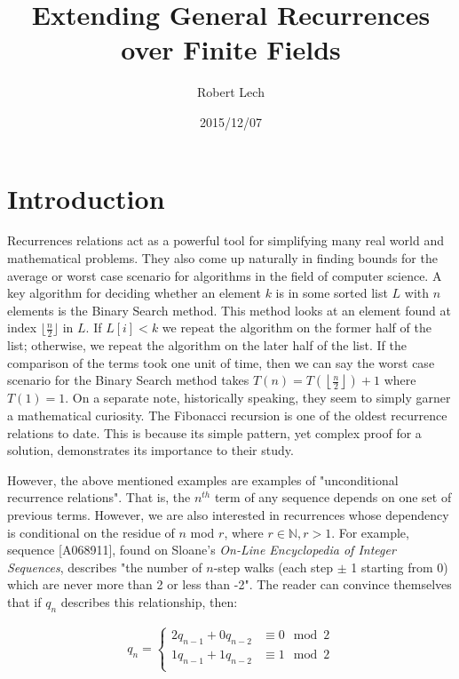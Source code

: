 \documentclass[a4paper]{article}
\title{Extending General Recurrences over Finite Fields}
\author{Robert Lech}
\date{2015/12/07}
\theoremstyle{definition}
\begin{document}
\maketitle

\section{Introduction}

Recurrences relations act as a powerful tool for simplifying many real world and mathematical problems.
They also come up naturally in finding bounds for the average or worst case scenario for algorithms in
the field of computer science. A key algorithm for deciding whether an element $k$ is in some sorted
list $L$ with $n$ elements is the Binary Search method. This method looks at an element found at index
$\lfloor\frac{n}{2}\rfloor$ in $L$. If $L[i]<k$ we repeat the algorithm on the former half of the list;
otherwise, we repeat the algorithm on the later half of the list. If the comparison of the terms took
one unit of time, then we can say the worst case scenario for the Binary Search method takes
$T(n)=T\left(\left\lfloor\frac{n}{2}\right\rfloor\right)+1$ where $T(1)=1$. On a separate note,
historically speaking, they seem to simply garner a mathematical curiosity. The Fibonacci recursion is
one of the oldest recurrence relations to date. This is because its simple pattern, yet complex proof
for a solution, demonstrates its importance to their study. 

However, the above mentioned examples are examples of "unconditional recurrence relations". That is,
the $n^{th}$ term of any sequence depends on one set of previous terms. However, we are also
interested in recurrences whose dependency is conditional on the residue of $n$ mod $r$, where $r\in
\mathbb{N}, r>1$. For example, sequence [A068911], found on Sloane's \textit{On-Line Encyclopedia of
Integer Sequences}, describes "the number of $n$-step walks (each step $\pm$ 1 starting from 0) which
are never more than 2 or less than -2"\cite{bib:gen_cond_rec}. The reader can convince themselves that
if $q_n$ describes this relationship, then:

\begin{align*}
q_n=
\begin{cases}
2q_{n-1}+0q_{n-2} & \equiv 0 \mod 2 \\
1q_{n-1}+1q_{n-2} & \equiv 1 \mod 2 \\
\end{cases}
\end{align*}
\end{document}
